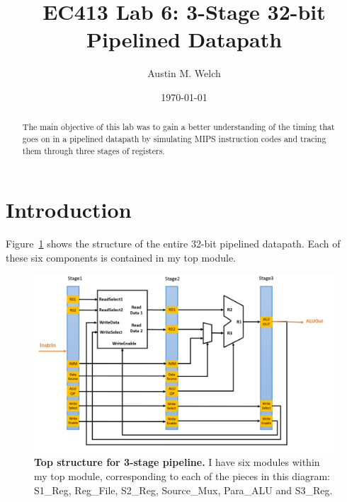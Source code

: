 \documentclass[letterpaper,12pt]{article}
\begin{document}
\title{EC413 Lab 6: 3-Stage 32-bit Pipelined Datapath}

\author{Austin M. Welch}
\date{\today}
\maketitle

\begin{abstract}

The main objective of this lab was to gain a better understanding of the timing that goes on
in a pipelined datapath by simulating MIPS instruction codes and tracing them through three
stages of registers. 

\end{abstract}

\section{Introduction}

 Figure~\ref{fig:top_diagram} shows the structure of the entire 32-bit pipelined datapath. Each of these six components is contained in my top module.

\begin{figure}[hb] 
        \includegraphics[width=1.0\columnwidth]{pipeline_pic}
        \caption{
                \label{fig:top_diagram} %
                {\bf Top structure for 3-stage pipeline.}
               I have six modules within my top module, corresponding to each of the pieces
               in this diagram: S1\_Reg, Reg\_File, S2\_Reg, Source\_Mux, Para\_ALU and S3\_Reg.
        }
\end{figure}
\end{document}
